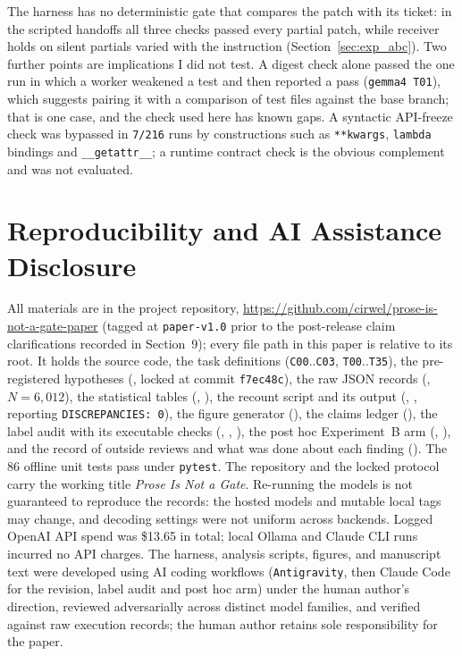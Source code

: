 \documentclass[11pt]{article}
\begin{document}
The harness has no deterministic gate that compares the patch with its ticket: in the scripted handoffs all three checks passed every partial patch, while receiver holds on silent partials varied with the instruction (Section~\ref{sec:exp_abc}). Two further points are implications I did not test. A digest check alone passed the one run in which a worker weakened a test and then reported a pass (\texttt{gemma4 T01}), which suggests pairing it with a comparison of test files against the base branch; that is one case, and the check used here has known gaps. A syntactic API-freeze check was bypassed in \texttt{7/216} runs by constructions such as \texttt{**kwargs}, \texttt{lambda} bindings and \texttt{\_\_getattr\_\_}; a runtime contract check is the obvious complement and was not evaluated.

\section{Reproducibility and AI Assistance Disclosure}
\label{sec:repro}

All materials are in the project repository, \url{https://github.com/cirwel/prose-is-not-a-gate-paper} (tagged at \texttt{paper-v1.0} prior to the post-release claim clarifications recorded in  Section~9); every file path in this paper is relative to its root. It holds the source code, the task definitions (\texttt{C00}..\texttt{C03}, \texttt{T00}..\texttt{T35}), the pre-registered hypotheses (, locked at commit \texttt{f7ec48c}), the raw JSON records (, \(N = 6{,}012\)), the statistical tables (, ), the recount script and its output (, , reporting \texttt{DISCREPANCIES: 0}), the figure generator (), the claims ledger (), the label audit with its executable checks (, , ), the post hoc Experiment~B arm (, ), and the record of outside reviews and what was done about each finding (). The 86 offline unit tests pass under \texttt{pytest}. The repository and the locked protocol carry the working title \emph{Prose Is Not a Gate}. Re-running the models is not guaranteed to reproduce the records: the hosted models and mutable local tags may change, and decoding settings were not uniform across backends. Logged OpenAI API spend was \$13.65 in total; local Ollama and Claude CLI runs incurred no API charges. The harness, analysis scripts, figures, and manuscript text were developed using AI coding workflows (\texttt{Antigravity}, then Claude Code for the revision, label audit and post hoc arm) under the human author's direction, reviewed adversarially across distinct model families, and verified against raw execution records; the human author retains sole responsibility for the paper.
\end{document}
